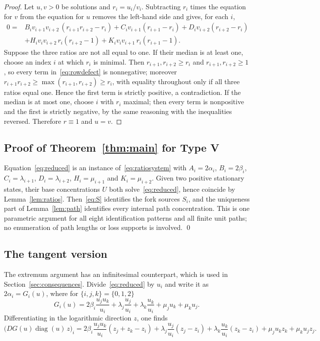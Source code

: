 \documentclass[11pt,a4paper]{article}
\theoremstyle{plain}
\theoremstyle{definition}
\theoremstyle{remark}
\numberwithin{equation}{section}
\newcommand{\diag}{\operatorname{diag}}
\begin{document}
\begin{proof}
Let $u,v>0$ be solutions and $r_i=u_i/v_i$. Subtracting $r_i$ times the equation for $v$ from the equation for $u$ removes the left-hand side and gives, for each $i$,
\begin{equation}\label{eq:rowdefect}
\begin{aligned}
0={}&B_iv_{i+1}v_{i+2}\,(r_{i+1}r_{i+2}-r_i)
+C_iv_{i+1}(r_{i+1}-r_i)+D_iv_{i+2}(r_{i+2}-r_i)\\
&+H_iv_iv_{i+2}\,r_i(r_{i+2}-1)+K_iv_iv_{i+1}\,r_i(r_{i+1}-1).
\end{aligned}
\end{equation}
Suppose the three ratios are not all equal to one. If their median is at least one, choose an index $i$ at which $r_i$ is minimal. Then $r_{i+1},r_{i+2}\ge r_i$ and $r_{i+1},r_{i+2}\ge1$, so every term in~\eqref{eq:rowdefect} is nonnegative; moreover $r_{i+1}r_{i+2}\ge\max(r_{i+1},r_{i+2})\ge r_i$, with equality throughout only if all three ratios equal one. Hence the first term is strictly positive, a contradiction. If the median is at most one, choose $i$ with $r_i$ maximal; then every term is nonpositive and the first is strictly negative, by the same reasoning with the inequalities reversed. Therefore $r\equiv1$ and $u=v$.
\end{proof}

\subsection{Proof of Theorem~\ref{thm:main} for Type V}
Equation~\eqref{eq:reduced} is an instance of~\eqref{eq:ratiosystem} with $A_i=2\alpha_i$, $B_i=2\beta_i$, $C_i=\lambda_{i+1}$, $D_i=\lambda_{i+2}$, $H_i=\mu_{i+1}$ and $K_i=\mu_{i+2}$. Given two positive stationary states, their base concentrations $U$ both solve~\eqref{eq:reduced}, hence coincide by Lemma~\ref{lem:ratios}. Then~\eqref{eq:S} identifies the fork sources $S_i$, and the uniqueness part of Lemma~\ref{lem:path} identifies every internal path concentration. This is one parametric argument for all eight identification patterns and all finite unit paths; no enumeration of path lengths or loss supports is involved. \qed

\subsection{The tangent version}
The extremum argument has an infinitesimal counterpart, which is used in Section~\ref{sec:consequences}. Divide~\eqref{eq:reduced} by $u_i$ and write it as $2\alpha_i=G_i(u)$, where for $\{i,j,k\}=\{0,1,2\}$
\begin{equation}\label{eq:G}
G_i(u)=2\beta_i\frac{u_ju_k}{u_i}+\lambda_j\frac{u_j}{u_i}+\lambda_k\frac{u_k}{u_i}+\mu_ju_k+\mu_ku_j .
\end{equation}
Differentiating in the logarithmic direction $z$, one finds
\begin{equation}\label{eq:K}
\bigl(DG(u)\diag(u)\,z\bigr)_i
=2\beta_i\frac{u_ju_k}{u_i}(z_j+z_k-z_i)
+\lambda_j\frac{u_j}{u_i}(z_j-z_i)+\lambda_k\frac{u_k}{u_i}(z_k-z_i)
+\mu_ju_kz_k+\mu_ku_jz_j .
\end{equation}
\end{document}
